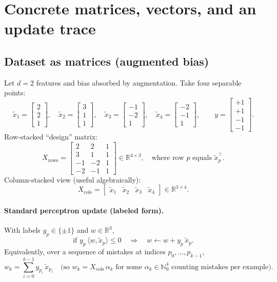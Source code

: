 \documentclass[11pt]{article}
\begin{document}
\newpage
\section{Concrete matrices, vectors, and an update trace}

\subsection{Dataset as matrices (augmented bias)}
Let $d=2$ features and bias absorbed by augmentation. Take four separable points:
\[
\tilde x_1=\begin{bmatrix}2\\2\\1\end{bmatrix},\quad
\tilde x_2=\begin{bmatrix}3\\1\\1\end{bmatrix},\quad
\tilde x_3=\begin{bmatrix}-1\\-2\\1\end{bmatrix},\quad
\tilde x_4=\begin{bmatrix}-2\\-1\\1\end{bmatrix},\qquad
y=\begin{bmatrix}+1\\+1\\-1\\-1\end{bmatrix}.
\]
Row-stacked “design” matrix:
\[
X_{\text{rows}}
=
\begin{bmatrix}
2&2&1\\
3&1&1\\
-1&-2&1\\
-2&-1&1
\end{bmatrix}\in\mathbb{R}^{4\times 3},
\quad\text{where row }p\text{ equals }\tilde x_p^\top.
\]
Column-stacked view (useful algebraically):
\[
X_{\text{cols}}=\begin{bmatrix}\tilde x_1&\tilde x_2&\tilde x_3&\tilde x_4\end{bmatrix}\in\mathbb{R}^{3\times 4}.
\]

\paragraph{Standard perceptron update (labeled form).}
With labels $y_p\in\{\pm1\}$ and $w\in\mathbb{R}^{3}$,
\[
\text{if }y_p\,\langle w,\tilde x_p\rangle \le 0\quad\Longrightarrow\quad
w\leftarrow w + y_p\,\tilde x_p.
\]
Equivalently, over a sequence of mistakes at indices $p_0,\dots,p_{k-1}$,
\[
w_k=\sum_{i=0}^{k-1} y_{p_i}\,\tilde x_{p_i}
\quad\text{(so }w_k=X_{\text{cols}}\,\alpha_k\text{ for some }\alpha_k\in\mathbb{N}_0^{4}\text{ counting mistakes per example).}
\]
\end{document}
